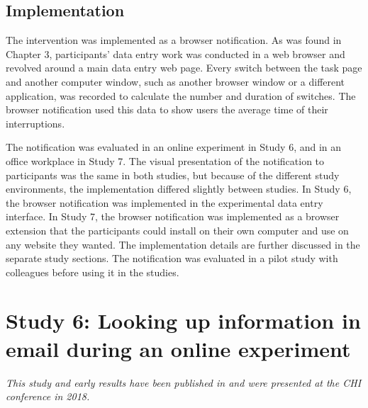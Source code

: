 \subsection{Implementation}
The intervention was implemented as a browser notification. As was found in Chapter 3, participants’ data entry work was conducted in a web browser and revolved around a main data entry web page. Every switch between the task page and another computer window, such as another browser window or a different application, was recorded to calculate the number and duration of switches. The browser notification used this data to show users the average time of their interruptions. 

The notification was evaluated in an online experiment in Study 6, and in an office workplace in Study 7. The visual presentation of the notification to participants was the same in both studies, but because of the different study environments, the implementation differed slightly between studies. In Study 6, the browser notification was implemented in the experimental data entry interface. In Study 7, the browser notification was implemented as a browser extension that the participants could install on their own computer and use on any website they wanted. The implementation details are further discussed in the separate study sections. The notification was evaluated in a pilot study with colleagues before using it in the studies. 

\section{Study 6: Looking up information in email during an online experiment}\label{st:Study6}
\textit{This study and early results have been published in \citet{Borghouts2018a} and were presented at the CHI conference in 2018.}

